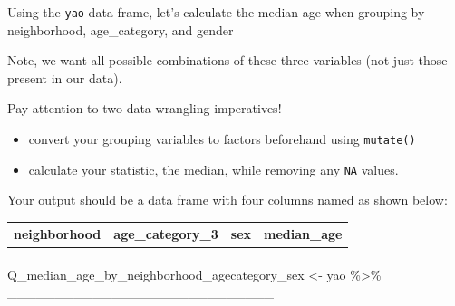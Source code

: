 \documentclass[
  letterpaper,
  DIV=11,
  numbers=noendperiod]{scrreprt}
\newenvironment{Shaded}{\begin{snugshade}}{\end{snugshade}}
\newcommand{\NormalTok}[1]{\textcolor[rgb]{0.00,0.23,0.31}{#1}}
\newcommand{\OtherTok}[1]{\textcolor[rgb]{0.00,0.23,0.31}{#1}}
\newcommand{\SpecialCharTok}[1]{\textcolor[rgb]{0.37,0.37,0.37}{#1}}
\providecommand{\tightlist}{%
  \setlength{\itemsep}{0pt}\setlength{\parskip}{0pt}}\usepackage{longtable,booktabs,array}
\begin{document}
\begin{tcolorbox}[enhanced jigsaw, title=\textcolor{quarto-callout-tip-color}{\faLightbulb}\hspace{0.5em}{Practice}, colbacktitle=quarto-callout-tip-color!10!white, leftrule=.75mm, arc=.35mm, opacityback=0, bottomrule=.15mm, rightrule=.15mm, toptitle=1mm, breakable, toprule=.15mm, colback=white, coltitle=black, colframe=quarto-callout-tip-color-frame, bottomtitle=1mm, titlerule=0mm, left=2mm, opacitybacktitle=0.6]

Using the \texttt{yao} data frame, let's calculate the median age when
grouping by neighborhood, age\_category, and gender

Note, we want all possible combinations of these three variables (not
just those present in our data).

Pay attention to two data wrangling imperatives!

\begin{itemize}
\tightlist
\item
  convert your grouping variables to factors beforehand using
  \texttt{mutate()}
\item
  calculate your statistic, the median, while removing any \texttt{NA}
  values.
\end{itemize}

Your output should be a data frame with four columns named as shown
below:

\begin{longtable}[]{@{}llll@{}}
\toprule\noalign{}
neighborhood & age\_category\_3 & sex & median\_age \\
\midrule\noalign{}
\endhead
\bottomrule\noalign{}
\endlastfoot
& & & \\
\end{longtable}

\begin{Shaded}
\begin{Highlighting}[]
\NormalTok{Q\_median\_age\_by\_neighborhood\_agecategory\_sex }\OtherTok{\textless{}{-}} 
\NormalTok{  yao }\SpecialCharTok{\%\textgreater{}\%}
\NormalTok{  \_\_\_\_\_\_\_\_\_\_\_\_\_\_\_\_\_\_\_\_\_\_\_\_\_\_\_\_}
\end{Highlighting}
\end{Shaded}

\end{tcolorbox}
\end{document}
